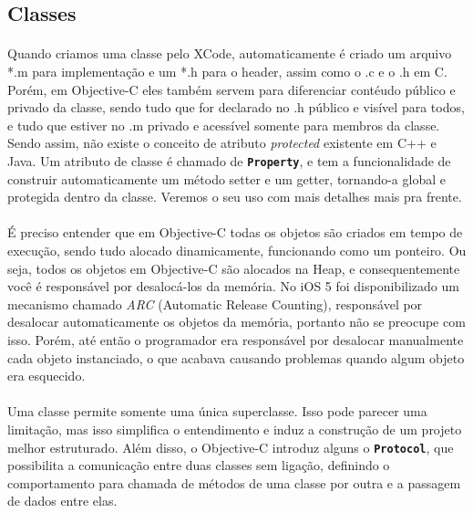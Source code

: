 \documentclass[a4paper,12pt,brazil,doubleside]{book}
\begin{document}
\begin{singlespace}
\bigskip 

\subsection{Classes}

\paragraph{}Quando criamos uma classe pelo XCode, automaticamente é criado um arquivo *.m para implementação e um *.h para o header, assim como o .c e o .h em C. Porém, em Objective-C eles também servem para diferenciar contéudo público e privado da classe, sendo tudo que for declarado no .h público e visível para todos, e tudo que estiver no .m privado e acessível somente para membros da classe. Sendo assim, não existe o conceito de atributo \emph{protected} existente em C++ e Java. Um atributo de classe é chamado de \texttt{\textbf{Property}}, e tem a funcionalidade de construir automaticamente um método setter e um getter, tornando-a global e protegida dentro da classe. Veremos o seu uso com mais detalhes mais pra frente.

\paragraph{}É preciso entender que em Objective-C todas os objetos são criados em tempo de execução, sendo tudo alocado dinamicamente, funcionando como um ponteiro. Ou seja, todos os objetos em Objective-C são alocados na Heap, e consequentemente você é responsável por desalocá-los da memória. No iOS 5 foi disponibilizado um mecanismo chamado \emph{ARC} (Automatic Release Counting), responsável por desalocar automaticamente os objetos da memória, portanto não se preocupe com isso. Porém, até então o programador era responsável por desalocar manualmente cada objeto instanciado, o que acabava causando problemas quando algum objeto era esquecido.
\paragraph{}Uma classe permite  somente uma única superclasse. Isso pode parecer uma limitação, mas isso simplifica o entendimento e induz a construção de um projeto melhor estruturado. Além disso, o Objective-C introduz alguns o \texttt{\textbf{Protocol}}, que possibilita a comunicação entre duas classes sem ligação, definindo o comportamento para chamada de métodos de uma classe por outra e a passagem de dados entre elas.


\end{singlespace}
\end{document}
